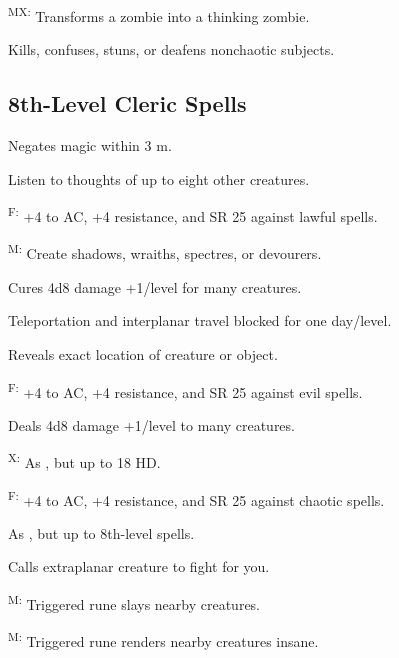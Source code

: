 \textsuperscript{MX:} Transforms a zombie into a thinking zombie. %

 Kills, confuses, stuns, or deafens nonchaotic subjects.



\subsection{8th-Level Cleric Spells}

 Negates magic within 3 m.

 Listen to thoughts of up to eight other creatures.

\textsuperscript{F:} +4 to AC, +4 resistance, and SR 25 against lawful spells.

\textsuperscript{M:} Create shadows, wraiths, spectres, or devourers.

 Cures 4d8 damage +1/level for many creatures.

 Teleportation and interplanar travel blocked for one day/level.

 Reveals exact location of creature or object.



\textsuperscript{F:} +4 to AC, +4 resistance, and SR 25 against evil spells.

 Deals 4d8 damage +1/level to many creatures.

\textsuperscript{X:} As , but up to 18 HD.

\textsuperscript{F:} +4 to AC, +4 resistance, and SR 25 against chaotic spells.

 As , but up to 8th-level spells.

 Calls extraplanar creature to fight for you.

\textsuperscript{M:} Triggered rune slays nearby creatures.

\textsuperscript{M:} Triggered rune renders nearby creatures insane.

